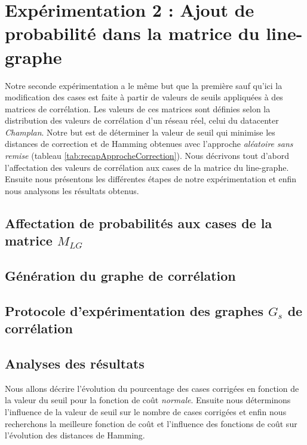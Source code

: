 \documentclass[onecolumn, 12pt]{book}
\begin{document}
\section{Exp\'erimentation 2 : Ajout de probabilit\'e dans la matrice du line-graphe}

Notre seconde exp\'erimentation a le m\^eme but que la premi\`ere sauf qu'ici la modification des cases est faite \`a partir de valeurs de seuils appliqu\'ees \`a des matrices de corr\'elation. Les valeurs de ces matrices sont d\'efinies selon la distribution des valeurs de corr\'elation d'un r\'eseau r\'eel, celui du datacenter {\em Champlan}.
\newline
Notre but est de d\'eterminer la valeur de seuil qui minimise les distances de correction et de Hamming obtenues avec l'approche {\em al\'eatoire sans remise} (tableau \ref{tab:recapApprocheCorrection}). 
\newline
Nous d\'ecrivons tout d'abord l'affectation des valeurs de corr\'elation aux cases de la matrice du line-graphe. Ensuite nous pr\'esentons les diff\'erentes \'etapes de notre exp\'erimentation et enfin nous analysons les r\'esultats obtenus.
	\subsection{Affectation de probabilit\'es aux cases de la matrice $M_{LG}$}
		\label{affectationValeursProbabilites}
		
	\subsection{G\'en\'eration du graphe de corr\'elation }
		\label{experimentation2GenerationMatriceProbabiliteAvecSeuil}
		
	\subsection{Protocole d'exp\'erimentation des graphes  $G_s$ de corr\'elation} 
		
	\subsection{Analyses des r\'esultats}
	Nous allons d\'ecrire l'\'evolution du pourcentage des cases corrig\'ees en fonction de la valeur du seuil pour la fonction de co\^ut {\em normale}. Ensuite nous d\'eterminons l'influence de la valeur de seuil sur le nombre de cases corrig\'ees et enfin nous recherchons la meilleure fonction de co\^ut et l'influence des fonctions de co\^ut sur l'\'evolution des distances de Hamming.
\end{document}
